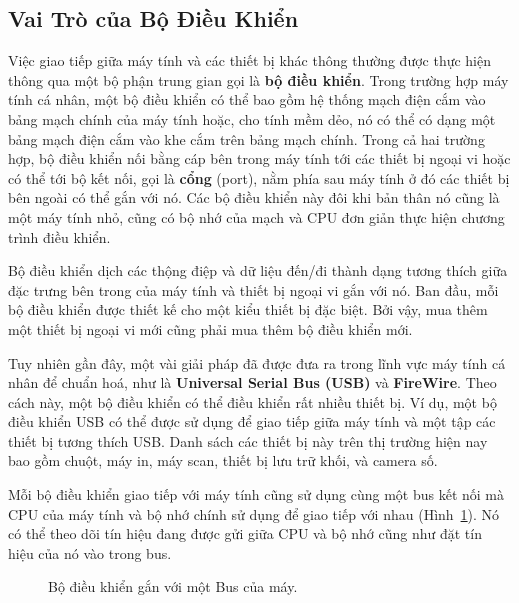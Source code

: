 \subsection*{Vai Trò của Bộ Điều Khiển}

Việc giao tiếp giữa máy tính và các thiết bị khác thông thường được thực hiện thông qua
một bộ phận trung gian gọi là \textbf{bộ điều khiển}. Trong trường hợp máy tính cá nhân,
một bộ điều khiển có thể bao gồm hệ thống mạch điện cắm vào bảng mạch chính của máy tính
hoặc, cho tính mềm dẻo, nó có thể có dạng một bảng mạch điện cắm vào khe cắm trên bảng
mạch chính. Trong cả hai trường hợp, bộ điều khiển nối bằng cáp bên trong máy tính tới các
thiết bị ngoại vi hoặc có thể tới bộ kết nối, gọi là \textbf{cổng} (port), nằm phía sau
máy tính ở đó các thiết bị bên ngoài có thể gắn với nó. Các bộ điều khiển này đôi khi bản
thân nó cũng là một máy tính nhỏ, cũng có bộ nhớ của mạch và CPU đơn giản thực hiện chương
trình điều khiển.

Bộ điều khiển dịch các thộng điệp và dữ liệu đến/đi thành dạng tương thích giữa đặc trưng
bên trong của máy tính và thiết bị ngoại vi gắn với nó. Ban đầu, mỗi bộ điều khiển được
thiết kế cho một kiểu thiết bị đặc biệt. Bởi vậy, mua thêm một thiết bị ngoại vi mới cũng
phải mua thêm bộ điều khiển mới.

Tuy nhiên gần đây, một vài giải pháp đã được đưa ra trong lĩnh vực máy tính cá nhân để
chuẩn hoá, như là \textbf{Universal Serial Bus (USB)} và \textbf{FireWire}. Theo cách này,
một bộ điều khiển có thể điều khiển rất nhiều thiết bị. Ví dụ, một bộ điều khiển USB có
thể được sử dụng để giao tiếp giữa máy tính và một tập các thiết bị tương thích USB. Danh
sách các thiết bị này trên thị trường hiện nay bao gồm chuột, máy in, máy scan, thiết bị
lưu trữ khối, và camera số.

Mỗi bộ điều khiển giao tiếp với máy tính cũng sử dụng cùng một bus kết nối mà CPU của máy
tính và bộ nhớ chính sử dụng để giao tiếp với nhau (Hình~\ref{fig:fig213}). Nó có thể theo
dõi tín hiệu đang được gửi giữa CPU và bộ nhớ cũng như đặt tín hiệu của nó vào trong bus.

\begin{figure}
  \centering {}
  \caption{Bộ điều khiển gắn với một Bus của máy.}
  \label{fig:fig213}
\end{figure}

